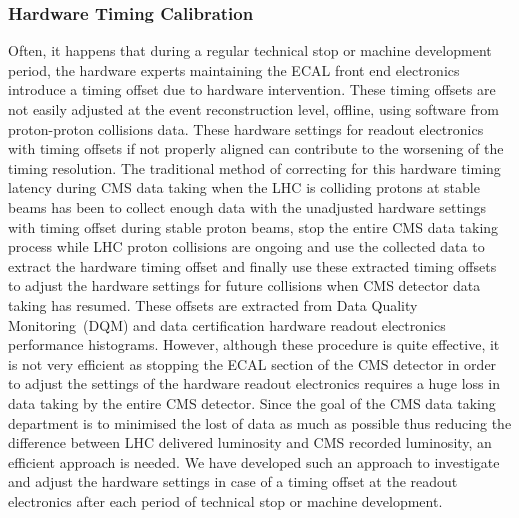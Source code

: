 \begin{center}
{}
\label{fig:TimeCalib}
\end{center}

\subsubsection{Hardware Timing Calibration}
Often, it happens that during a regular technical stop or machine development period, the hardware experts maintaining the ECAL front end electronics introduce a timing offset due to hardware intervention. These timing offsets are not easily adjusted at the event reconstruction level, offline, using software from proton-proton collisions data. These hardware settings for readout electronics with timing offsets if not properly aligned can contribute to the worsening of the timing resolution. The traditional method of correcting for this hardware timing latency during CMS data taking when the LHC is colliding protons at stable beams has been to collect enough data with the unadjusted hardware settings with timing offset during stable proton beams, stop the entire CMS data taking process while LHC proton collisions are ongoing and use the collected data to extract the hardware timing offset and finally use these extracted timing offsets to adjust the hardware settings for future collisions when CMS detector data taking has resumed. These offsets are extracted from Data Quality Monitoring~(DQM) and data certification hardware readout electronics performance histograms. However, although these procedure is quite effective, it is not very efficient as stopping the ECAL section of the CMS detector in order to adjust the settings of the hardware readout electronics requires a huge loss in data taking by the entire CMS detector. Since the goal of the CMS data taking department is to minimised the lost of data as much as possible thus reducing the difference between LHC delivered luminosity and CMS recorded luminosity, an efficient approach is needed. We have developed such an approach to investigate and adjust the hardware settings in case of a timing offset at the readout electronics after each period of technical stop or machine development.

